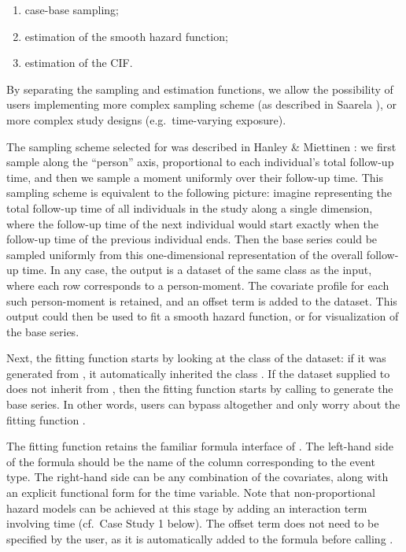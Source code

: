 \begin{enumerate}
\def\labelenumi{\arabic{enumi}.}
\tightlist
\item
  case-base sampling;
\item
  estimation of the smooth hazard function;
\item
  estimation of the CIF.
\end{enumerate}

By separating the sampling and estimation functions, we allow the
possibility of users implementing more complex sampling scheme (as
described in Saarela \citeyearpar{saarela2016case}), or more complex
study designs (e.g.~time-varying exposure).

The sampling scheme selected for  was described in
Hanley \& Miettinen \citeyearpar{hanley2009fitting}: we first sample
along the ``person'' axis, proportional to each individual's total
follow-up time, and then we sample a moment uniformly over their
follow-up time. This sampling scheme is equivalent to the following
picture: imagine representing the total follow-up time of all
individuals in the study along a single dimension, where the follow-up
time of the next individual would start exactly when the follow-up time
of the previous individual ends. Then the base series could be sampled
uniformly from this one-dimensional representation of the overall
follow-up time. In any case, the output is a dataset of the same class
as the input, where each row corresponds to a person-moment. The
covariate profile for each such person-moment is retained, and an offset
term is added to the dataset. This output could then be used to fit a
smooth hazard function, or for visualization of the base series.

Next, the fitting function  starts by looking at
the class of the dataset: if it was generated from
, it automatically inherited the class
. If the dataset supplied to  does
not inherit from , then the fitting function starts by
calling  to generate the base series. In other
words, users can bypass  altogether and only worry
about the fitting function .

The fitting function retains the familiar formula interface of
. The left-hand side of the formula should be the name of the
column corresponding to the event type. The right-hand side can be any
combination of the covariates, along with an explicit functional form
for the time variable. Note that non-proportional hazard models can be
achieved at this stage by adding an interaction term involving time
(cf.~Case Study 1 below). The offset term does not need to be specified
by the user, as it is automatically added to the formula before calling
.

